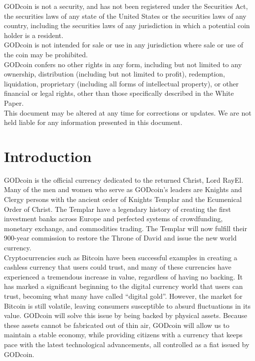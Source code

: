 \documentclass[12pt,a4paper]{article}
\begin{document}
  GODcoin is not a security, and has not been registered under the Securities
  Act, the securities laws of any state of the United States or the securities
  laws of any country, including the securities laws of any jurisdiction in
  which a potential coin holder is a resident.\\

  GODcoin is not intended for sale or use in any jurisdiction where sale or use
  of the coin may be prohibited.\\

  GODcoin confers no other rights in any form, including but not limited to any
  ownership, distribution (including but not limited to profit), redemption,
  liquidation, proprietary (including all forms of intellectual property), or
  other financial or legal rights, other than those specifically described in
  the White Paper.\\

  This document may be altered at any time for corrections or updates. We are
  not held liable for any information presented in this document.

  \newpage
  \tableofcontents
  \newpage

  \section{Introduction}
  GODcoin is the official currency dedicated to the returned Christ, Lord RayEl.
  Many of the men and women who serve as GODcoin’s leaders are Knights and
  Clergy persons with the ancient order of Knights Templar and the Ecumenical
  Order of Christ. The Templar have a legendary history of creating the first
  investment banks across Europe and perfected systems of crowdfunding, monetary
  exchange, and commodities trading. The Templar will now fulfill their 900-year
  commission to restore the Throne of David and issue the new world currency.\\

  Cryptocurrencies such as Bitcoin have been successful examples in creating a
  cashless currency that users could trust, and many of these currencies have
  experienced a tremendous increase in value, regardless of having no backing.
  It has marked a significant beginning to the digital currency world that users
  can trust, becoming what many have called ``digital gold''. However, the
  market for Bitcoin is still volatile, leaving consumers susceptible to absurd
  fluctuations in its value. GODcoin will solve this issue by being backed by
  physical assets. Because these assets cannot be fabricated out of thin air,
  GODcoin will allow us to maintain a stable economy, while providing citizens
  with a currency that keeps pace with the latest technological advancements,
  all controlled as a fiat issued by GODcoin.\\
\end{document}
